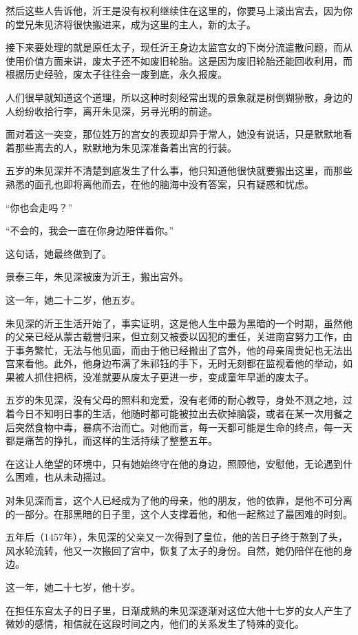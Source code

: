 \begin{multicols}{\theparacolNo}
		然后这些人告诉他，沂王是没有权利继续住在这里的，你要马上滚出宫去，因为你的堂兄朱见济将很快搬进来，成为这里的主人，新的太子。

		接下来要处理的就是原任太子，现任沂王身边太监宫女的下岗分流遣散问题，而从使用价值方面来讲，废太子还不如废旧轮胎。这是因为废旧轮胎还能回收利用，而根据历史经验，废太子往往会一废到底，永久报废。

		人们很早就知道这个道理，所以这种时刻经常出现的景象就是树倒猢狲散，身边的人纷纷收拾行李，离开朱见深，另寻光明的前途。

		面对着这一突变，那位姓万的宫女的表现却异于常人，她没有说话，只是默默地看着那些离去的人，默默地为朱见深准备着出宫的行装。

		五岁的朱见深并不清楚到底发生了什么事，他只知道他很快就要搬出这里，而那些熟悉的面孔也即将离他而去，在他的脑海中没有答案，只有疑惑和忧虑。

		“你也会走吗？”

		“不会的，我会一直在你身边陪伴着你。”

		这句话，她最终做到了。

		景泰三年，朱见深被废为沂王，搬出宫外。

		这一年，她二十二岁，他五岁。

		朱见深的沂王生活开始了，事实证明，这是他人生中最为黑暗的一个时期，虽然他的父亲已经从蒙古载誉归来，但立刻又被委以囚犯的重任，关进南宫努力工作，由于事务繁忙，无法与他见面，而由于他已经搬出了宫外，他的母亲周贵妃也无法出宫来看他。此外，他身边布满了朱祁钰的手下，无时无刻都在监视着他的举动，如果被人抓住把柄，没准就要从废太子更进一步，变成童年早逝的废太子。

		五岁的朱见深，没有父母的照料和宠爱，没有老师的耐心教导，身处不测之地，过着今日不知明日事的生活，他随时都可能被拉出去砍掉脑袋，或者在某一次用餐之后突然食物中毒，暴病不治而亡。对他而言，每一天都可能是生命的终点，每一天都是痛苦的挣扎，而这样的生活持续了整整五年。

		在这让人绝望的环境中，只有她始终守在他的身边，照顾他，安慰他，无论遇到什么困难，也从未动摇过。

		对朱见深而言，这个人已经成为了他的母亲，他的朋友，他的依靠，是他不可分离的一部分。在那黑暗的日子里，这个人支撑着他，和他一起熬过了最困难的时刻。

		五年后（1457年），朱见深的父亲又一次得到了皇位，他的苦日子终于熬到了头，风水轮流转，他又一次搬回了宫中，恢复了太子的身份。自然，她仍陪伴在他的身边。

		这一年，她二十七岁，他十岁。

		在担任东宫太子的日子里，日渐成熟的朱见深逐渐对这位大他十七岁的女人产生了微妙的感情，相信就在这段时间之内，他们的关系发生了特殊的变化。


\end{multicols}
